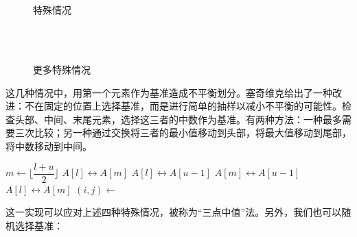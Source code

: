 \documentclass[b5paper]{ctexart}
\begin{document}
\begin{figure}[htbp]
   \centering
    \\
    \\
   \caption{特殊情况}
   \label{fig:worst-cases-1}
\end{figure}

\begin{figure}[htbp]
   \centering
    \\
    \\
   \caption{更多特殊情况}
   \label{fig:worst-cases-2}
\end{figure}

这几种情况中，用第一个元素作为基准造成不平衡划分。塞奇维克给出了一种改进\cite{qsort-impl}：不在固定的位置上选择基准，而是进行简单的抽样以减小不平衡的可能性。检查头部、中间、末尾元素，选择这三者的中数作为基准。有两种方法：一种最多需要三次比较\cite{3-way-part}；另一种通过交换将三者的最小值移动到头部，将最大值移动到尾部，将中数移动到中间。

\begin{algorithmic}[1]
    \State $m \gets \lfloor \dfrac{l + u}{2} \rfloor$ 
     
      \State {} $A[l] \leftrightarrow A[m]$
    \EndIf
     
      \State {} $A[l] \leftrightarrow A[u-1]$
    \EndIf
     
      \State {} $A[m] \leftrightarrow A[u-1]$
    \EndIf
    \State {} $A[l] \leftrightarrow A[m]$
    \State $(i, j) \gets $ 
    \State {}
    \State {}
  \EndIf
\EndProcedure
\end{algorithmic}

这一实现可以应对上述四种特殊情况，被称为“三点中值”法。另外，我们也可以随机选择基准：
\end{document}
